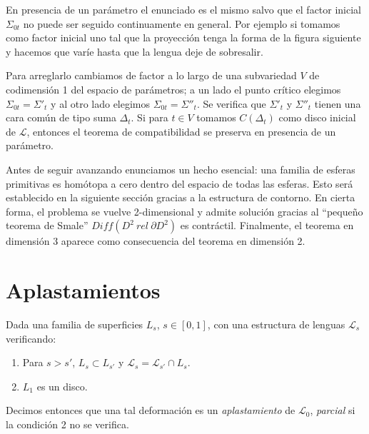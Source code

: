 \documentclass[twoside, 11pt]{article}
\begin{document}
En presencia de un parámetro el enunciado es el mismo salvo que el factor inicial $\Sigma_{0t}$ no puede ser seguido continuamente en general. Por ejemplo si tomamos como factor inicial uno tal que la proyección tenga la forma de la figura siguiente y hacemos que varíe hasta que la lengua deje de sobresalir.


 Para arreglarlo cambiamos de factor a lo largo de una subvariedad $V$ de codimensión 1 del espacio de parámetros; a un lado el punto crítico elegimos $\Sigma_{0t}=\Sigma'_t$ y al otro lado elegimos $\Sigma_{0t}=\Sigma''_t$. Se verifica que $\Sigma'_t$ y $\Sigma''_t$ tienen una cara común de tipo suma $\Delta_t$. Si para $t\in V$ tomamos $C(\Delta_t)$ como disco inicial de $\mathcal{L}$, entonces el teorema de compatibilidad se preserva en presencia de un parámetro. 

Antes de seguir avanzando enunciamos un hecho esencial: una familia de esferas primitivas es homótopa a cero dentro del espacio de todas las esferas. Esto será establecido en la siguiente sección gracias a la estructura de contorno. En cierta forma, el problema se vuelve 2-dimensional y admite solución gracias al ``pequeño teorema de Smale'' \cite[Proposición 4.2]{Bo} $Diff(D^2\ rel\ \partial D^2)$ es contráctil. Finalmente, el teorema en dimensión 3 aparece como consecuencia del teorema en dimensión 2. 
\section{Aplastamientos}

\begin{defi}
Dada una familia de superficies $L_s$, $s\in [0,1]$, con una estructura de lenguas $\mathcal{L}_s$ verificando:
\begin{enumerate}
\item Para $s>s'$, $L_s\subset L_{s'}$ y $\mathcal{L}_s=\mathcal{L}_{s'}\cap L_s$.
\item $L_1$ es un disco. 
\end{enumerate}
Decimos entonces que una tal deformación es un \emph{aplastamiento} de $\mathcal{L}_0$, \emph{parcial} si la condición 2 no se verifica. 
\end{defi}
\end{document}
